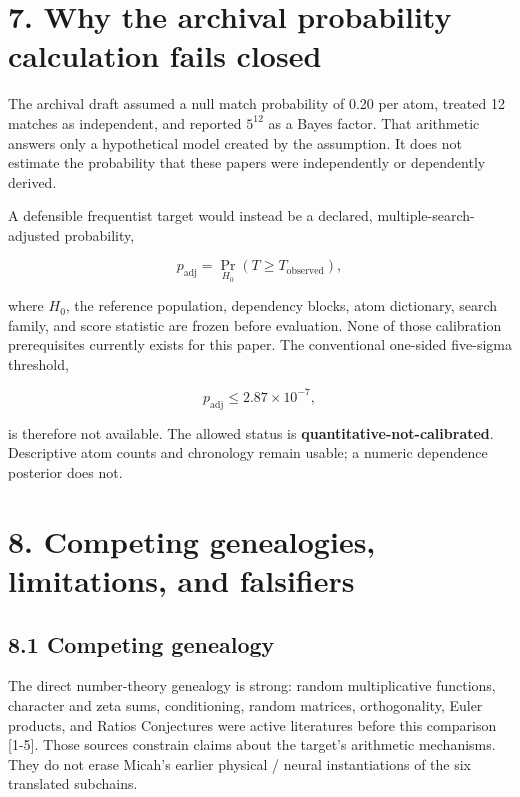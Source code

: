 \documentclass[
  american,
  11pt,
  letterpaper,
]{article}
\begin{document}
\section{7. Why the archival probability calculation fails closed}\label{why-the-archival-probability-calculation-fails-closed}

The archival draft assumed a null match probability of 0.20 per atom, treated 12 matches as independent, and reported \(5^{12}\) as a Bayes factor. That arithmetic answers only a hypothetical model created by the assumption. It does not estimate the probability that these papers were independently or dependently derived.

A defensible frequentist target would instead be a declared, multiple-search-adjusted probability,

\begin{equation}
p_{\mathrm{adj}}
=
\Pr_{H_0}\!\left(T\ge T_{\mathrm{observed}}\right),
\tag{13}
\end{equation}

where \(H_0\), the reference population, dependency blocks, atom dictionary, search family, and score statistic are frozen before evaluation. None of those calibration prerequisites currently exists for this paper. The conventional one-sided five-sigma threshold,

\begin{equation}
p_{\mathrm{adj}}\le 2.87\times10^{-7},
\tag{14}
\end{equation}

is therefore not available. The allowed status is \textbf{quantitative-not-calibrated}. Descriptive atom counts and chronology remain usable; a numeric dependence posterior does not.

\section{8. Competing genealogies, limitations, and falsifiers}\label{competing-genealogies-limitations-and-falsifiers}

\subsection{8.1 Competing genealogy}\label{competing-genealogy}

The direct number-theory genealogy is strong: random multiplicative functions, character and zeta sums, conditioning, random matrices, orthogonality, Euler products, and Ratios Conjectures were active literatures before this comparison {[}1-5{]}. Those sources constrain claims about the target's arithmetic mechanisms. They do not erase Micah's earlier physical / neural instantiations of the six translated subchains.
\end{document}
